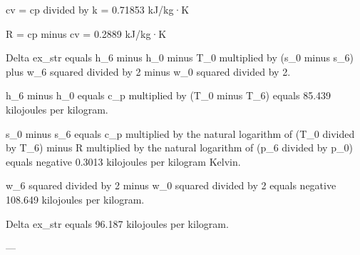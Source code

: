 cv = cp divided by k = 0.71853 kJ/kg·K  

R = cp minus cv = 0.2889 kJ/kg·K

Delta ex_str equals h_6 minus h_0 minus T_0 multiplied by (s_0 minus s_6) plus w_6 squared divided by 2 minus w_0 squared divided by 2.  

h_6 minus h_0 equals c_p multiplied by (T_0 minus T_6) equals 85.439 kilojoules per kilogram.  

s_0 minus s_6 equals c_p multiplied by the natural logarithm of (T_0 divided by T_6) minus R multiplied by the natural logarithm of (p_6 divided by p_0) equals negative 0.3013 kilojoules per kilogram Kelvin.  

w_6 squared divided by 2 minus w_0 squared divided by 2 equals negative 108.649 kilojoules per kilogram.  

Delta ex_str equals 96.187 kilojoules per kilogram.  

---